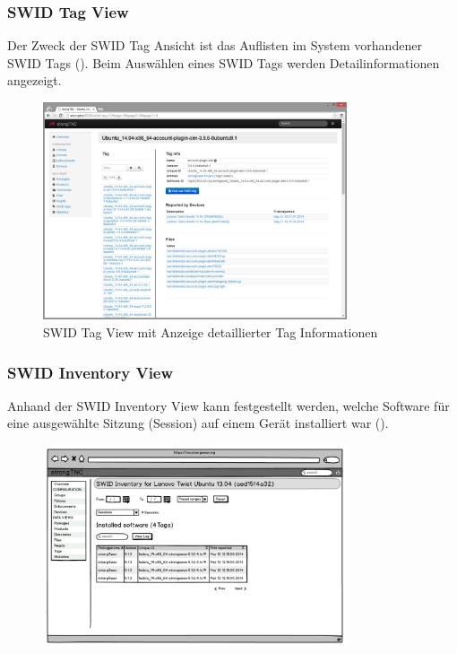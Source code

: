 \subsubsection{SWID Tag View}
Der Zweck der SWID Tag Ansicht ist das Auflisten im System vorhandener SWID Tags ().
Beim Auswählen eines SWID Tags werden Detailinformationen angezeigt.

\begin{figure}[H]
\centering
\includegraphics[width=0.8\textwidth]{./images/Views/tag-detail-view}
\caption{SWID Tag View mit Anzeige detaillierter Tag Informationen}
\label{fig:tag-detail-view}
\end{figure}

\subsubsection{SWID Inventory View}

Anhand der SWID Inventory View kann festgestellt werden, welche Software für eine ausgewählte Sitzung (Session) auf einem Gerät installiert war ().

\begin{figure}[H]
\centering
\includegraphics[width=0.8\textwidth]{./images/mockups/swid-inventory}
\caption{}
\label{fig:swid-inventory}
\end{figure}

